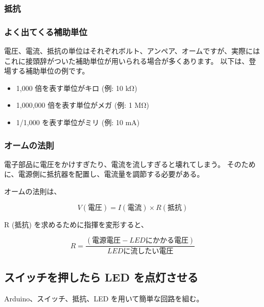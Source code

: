 \documentclass[11pt,a4paper]{jarticle}
\begin{document}
\subsubsection*{抵抗}

\subsubsection*{よく出てくる補助単位}
電圧、電流、抵抗の単位はそれぞれボルト、アンペア、オームですが、実際にはこれに接頭辞がついた補助単位が用いられる場合が多くあります。
以下は、登場する補助単位の例です。
\begin{itemize}
 \item 1,000 倍を表す単位がキロ (例: 10 kΩ)
 \item 1,000,000 倍を表す単位がメガ (例: 1 MΩ)
 \item 1/1,000 を表す単位がミリ (例: 10 mA)
\end{itemize}

\subsubsection*{オームの法則}
電子部品に電圧をかけすぎたり、電流を流しすぎると壊れてしまう。
そのために、電源側に抵抗器を配置し、電流量を調節する必要がある。

オームの法則は、

\begin{equation}
 V (電圧) = I (電流) \times R (抵抗)
\end{equation}

R (抵抗) を求めるために指揮を変形すると、

\begin{equation}
 R = \frac{(電源電圧 - LEDにかかる電圧)}{LEDに流したい電圧}
\end{equation}


\subsection*{スイッチを押したら LED を点灯させる}
Arduino、スイッチ、抵抗、LED を用いて簡単な回路を組む。

\end{document}
